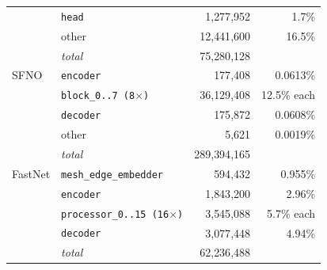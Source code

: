 \begin{table}[htbp]
\begin{tabular}{llrr}
 & \texttt{head} & 1{,}277{,}952 & 1.7\% \\
 & other & 12{,}441{,}600 & 16.5\% \\
 & \textit{total} & 75{,}280{,}128 & \\
\addlinespace
SFNO & \texttt{encoder} & 177{,}408 & 0.0613\% \\
 & \texttt{block\_0..7 (8$\times$)} & 36{,}129{,}408 & 12.5\% each \\
 & \texttt{decoder} & 175{,}872 & 0.0608\% \\
 & other & 5{,}621 & 0.0019\% \\
 & \textit{total} & 289{,}394{,}165 & \\
\addlinespace
FastNet & \texttt{mesh\_edge\_embedder} & 594{,}432 & 0.955\% \\
 & \texttt{encoder} & 1{,}843{,}200 & 2.96\% \\
 & \texttt{processor\_0..15 (16$\times$)} & 3{,}545{,}088 & 5.7\% each \\
 & \texttt{decoder} & 3{,}077{,}448 & 4.94\% \\
 & \textit{total} & 62{,}236{,}488 & \\
\bottomrule
\end{tabular}
\end{table}
